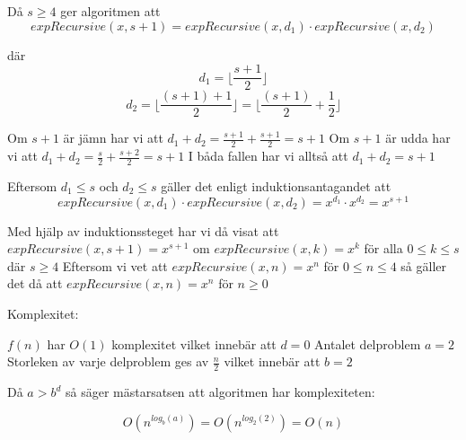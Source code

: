 \documentclass{article}
\begin{document}
\begin{enumerate}
Då \(s \geq 4\) ger algoritmen att
\[expRecursive(x, s+1) = expRecursive(x, d_1) \cdot expRecursive(x, d_2)\]

där
\[d_1 = \lfloor \frac{s+1}{2} \rfloor \]
\[d_2 = \lfloor \frac{(s+1)+1}{2} \rfloor = \lfloor \frac{(s+1)}{2}+\frac{1}{2} \rfloor \]

Om \(s+1\) är jämn har vi att
\(d_1 + d_2 = \frac{s+1}{2} + \frac{s+1}{2} = s+1\) \newline
Om \(s+1\) är udda har vi att
\(d_1 + d_2 = \frac{s}{2} + \frac{s+2}{2} = s+1\) \newline
I båda fallen har vi alltså att \(d_1+d_2=s+1\) \newline

Eftersom \(d_1 \leq s\) och \(d_2 \leq s\) gäller det enligt induktionsantagandet att
\[expRecursive(x, d_1) \cdot expRecursive(x, d_2) = x^{d_1} \cdot x^{d_2}=x^{s+1}\]

Med hjälp av induktionssteget har vi då visat att
\(expRecursive(x, s+1) = x^{s+1}\) om \(expRecursive(x, k) = x^k\) för alla \(0 \leq k \leq s\) där \(s \geq 4\) \newline
Eftersom vi vet att \(expRecursive(x, n)=x^n\) för \(0 \leq n \leq 4\) så gäller det då att \(expRecursive(x, n)=x^n\) för \(n \geq 0\) \newline

Komplexitet: \newline

\(f(n)\) har \(O(1)\) komplexitet vilket innebär att \(d=0\) \newline
Antalet delproblem \(a=2\) \newline
Storleken av varje delproblem ges av \(\frac{n}{2}\) vilket innebär att \(b=2\) \newline

Då \(a > b^d\) så säger mästarsatsen att algoritmen har komplexiteten:

\[O(n^{log_b(a)})=O(n^{log_2(2)})=O(n)\]



\end{enumerate}
\end{document}
